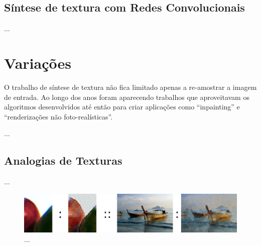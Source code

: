 










\section{Síntese de textura com Redes Convolucionais}

...






\iffalse
\chapter{Variações}

O trabalho de síntese de textura
não fica limitado apenas a re-amostrar
a imagem de entrada. Ao longo
dos anos foram aparecendo trabalhos
que aproveitavam os algoritmos
desenvolvidos até então para
criar aplicações como ``inpainting''
e ``renderizações não foto-realísticas''.

...

\section{Analogias de Texturas}

\cite{Hertzmann2001}

...

\begin{figure}[!ht]
	\centering
	\includegraphics[width=\linewidth*2/3]{files/assets/articles/heartzmann1.png}
	\caption{...}
	\label{img:preview}
\end{figure}

